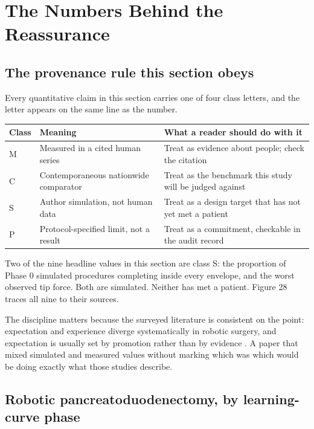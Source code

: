 \section{The Numbers Behind the Reassurance}

\subsection{The provenance rule this section obeys}

Every quantitative claim in this section carries one of four class letters, and
the letter appears on the same line as the number.

\vspace{0.30em}

\noindent\begin{tabularx}{\textwidth}{C{1.1cm} L{4.6cm} Y}
\toprule
\textbf{Class} & \textbf{Meaning} & \textbf{What a reader should do with it} \\
\midrule
M & Measured in a cited human series & Treat as evidence about people; check the citation \\
C & Contemporaneous nationwide comparator & Treat as the benchmark this study will be judged against \\
S & Author simulation, not human data & Treat as a design target that has not yet met a patient \\
P & Protocol-specified limit, not a result & Treat as a commitment, checkable in the audit record \\
\bottomrule
\end{tabularx}

\vspace{0.30em}

\noindent Two of the nine headline values in this section are class S: the
proportion of Phase 0 simulated procedures completing inside every envelope, and
the worst observed tip force. Both are simulated. Neither has met a patient.
Figure 28 traces all nine to their sources.

The discipline matters because the surveyed literature is consistent on the
point: expectation and experience diverge systematically in robotic surgery, and
expectation is usually set by promotion rather than by evidence
\cite{Jauniaux2025, BrarRAS2024X}. A paper that mixed simulated and measured
values without marking which was which would be doing exactly what those studies
describe.

\subsection{Robotic pancreatoduodenectomy, by learning-curve phase}

